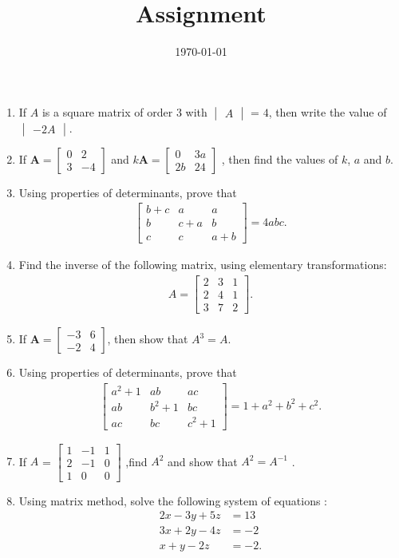 \documentclass[12pt,-letter paper]{article}
\title{Assignment}
\date{\today}
\let\vec\mathbf{}
\let\vec\mathbf{}
\let\vec\mathbf{}
\providecommand{\mydet}[1]{\ensuremath{\begin{vmatrix}#1\end{vmatrix}}}
\providecommand{\myvec}[1]{\ensuremath{\begin{bmatrix}#1\end{bmatrix}}}
\begin{document}
\begin{enumerate}
\section{Matrix}
\item If $A$ is a square matrix of order $3$ with   $\mydet{A}$ = $4$, then write the value of $\mydet {-2 A}$.

\item If $\vec{A}=\myvec{0&2\\3&-4}$ and $ k \vec{A}=\myvec{0&3a\\2b&24}$ , then find the values of $k$, $a$ and $b$.

\item Using properties of determinants, prove that 
\begin{align*}
    \myvec{b+c & a & a\\b & c+a & b\\c & c & a+b}=4abc.
\end{align*}

\item Find the inverse of the following matrix, using elementary
transformations: 
\begin{align*}
    A=\myvec{2 & 3 & 1\\2 & 4 & 1\\3 & 7 & 2}.
\end{align*}

\item If $\vec{A} = \myvec{-3&6\\-2&4}$, then show that $A^3= A$.

\item Using properties of determinants, prove that
\begin{align*}
\myvec{a^{2}+1&ab&ac\\ab&b^{2}+1&bc\\ac&bc&c^{2}+1} = 1+a^{2}+b^{2}+c^{2}.
\end{align*}
\item If $A$ = \myvec{1&-1&1\\2&-1&0\\1&0&0} ,find $A^{2}$ and show that $A^{2} = A^{-1}$ .

\item Using matrix method, solve the following system of equations :
\begin{align*}
    2x-3y+5z&=13\\
    3x+2y-4z &=-2\\
    x+y-2z&=-2.
\end{align*}


\end{enumerate}
\end{document}
